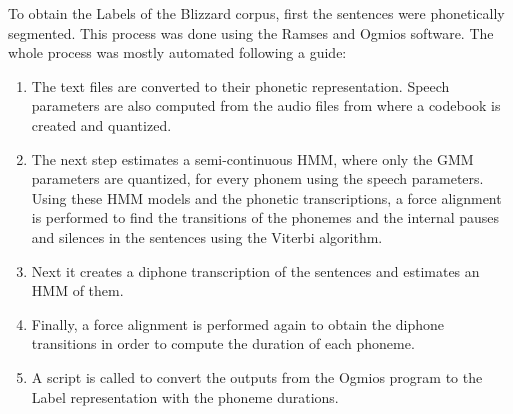 To obtain the Labels of the Blizzard corpus, first the sentences were phonetically segmented. This process was done using the Ramses and Ogmios \cite{bonafonte2006ogmios} software. The whole process was mostly automated following a guide:

\begin{enumerate}
    \item The text files are converted to their phonetic representation. Speech parameters are also computed from the audio files from where a codebook is created and quantized.
    \item The next step estimates a semi-continuous HMM, where only the GMM parameters are quantized, for every phonem using the speech parameters. Using these HMM models and the phonetic transcriptions, a force alignment is performed to find the transitions of the phonemes and the internal pauses and silences in the sentences using the Viterbi algorithm.
    \item Next it creates a diphone transcription \cite{marino1997demiphone} of the sentences and estimates an HMM of them.
    \item Finally, a force alignment is performed again to obtain the diphone transitions in order to compute the duration of each phoneme.
    \item A script is called to convert the outputs from the Ogmios program to the Label representation with the phoneme durations.
\end{enumerate}

